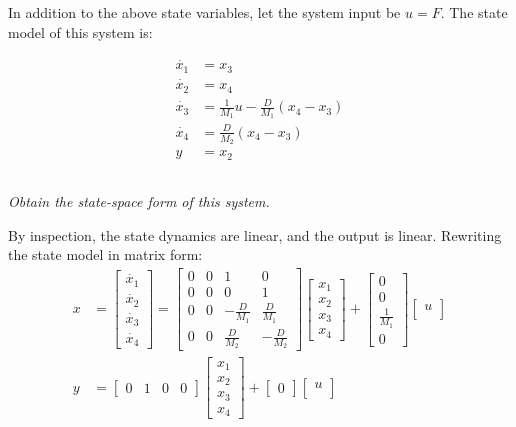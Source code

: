 In addition to the above state variables, let the system input be $u = F$. The state model of this system is:

\begin{align*}
    \dot{x_1} &= x_3 \\
    \dot{x_2} &= x_4 \\
    \dot{x_3} &= \frac{1}{M_1}u - \frac{D}{M_1}(x_4 - x_3) \\
    \dot{x_4} &= \frac{D}{M_2}(x_4 - x_3) \\
    y &= x_2
\end{align*}

\subsection{}
\textit{Obtain the state-space form of this system.}

By inspection, the state dynamics are linear, and the output is linear. Rewriting the state model in matrix form:
\begin{align*}
    x &=
    \begin{bmatrix}
        \dot{x_1} \\
        \dot{x_2} \\
        \dot{x_3} \\
        \dot{x_4}
    \end{bmatrix}
    =
    \begin{bmatrix}
        0 & 0 & 1 & 0 \\
        0 & 0 & 0 & 1 \\
        0 & 0 & -\frac{D}{M_1} & \frac{D}{M_1} \\
        0 & 0 & \frac{D}{M_2} & -\frac{D}{M_2}
    \end{bmatrix}
    \begin{bmatrix}
        x_1 \\
        x_2 \\
        x_3 \\
        x_4
    \end{bmatrix}
    +
    \begin{bmatrix}
        0 \\
        0 \\
        \frac{1}{M_1} \\
        0
    \end{bmatrix}
    \begin{bmatrix}
        u \\
    \end{bmatrix} \\
    y &=
    \begin{bmatrix}
        0 & 1 & 0 & 0
    \end{bmatrix}
    \begin{bmatrix}
        x_1 \\
        x_2 \\
        x_3 \\
        x_4
    \end{bmatrix}
    +
    \begin{bmatrix}
        0
    \end{bmatrix}
    \begin{bmatrix}
        u \\
    \end{bmatrix}
\end{align*}